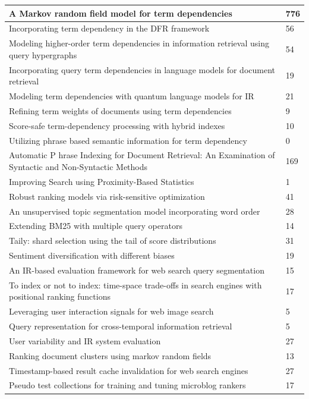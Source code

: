 \documentclass[letterpaper,11pt]{article}
\begin{document}
\begin{center}
\begin{longtable}{|*2{p{3.5cm}| }}
A Markov random field model for term dependencies & 776 \\ \hline
Incorporating term dependency in the DFR framework & 56 \\ \hline
Modeling higher-order term dependencies in information retrieval using query hypergraphs & 54 \\ \hline
Incorporating query term dependencies in language models for document retrieval & 19 \\ \hline
Modeling term dependencies with quantum language models for IR & 21 \\ \hline
Refining term weights of documents using term dependencies & 9 \\ \hline
Score-safe term-dependency processing with hybrid indexes & 10 \\ \hline
Utilizing phrase based semantic information for term dependency & 0 \\ \hline
Automatic P hrase Indexing for Document Retrieval: An Examination of Syntactic and Non-Syntactic Methods & 169 \\ \hline
Improving Search using Proximity-Based Statistics & 1 \\ \hline
Robust ranking models via risk-sensitive optimization & 41 \\ \hline
An unsupervised topic segmentation model incorporating word order & 28 \\ \hline
Extending BM25 with multiple query operators & 14 \\ \hline
Taily: shard selection using the tail of score distributions & 31 \\ \hline
Sentiment diversification with different biases & 19 \\ \hline
An IR-based evaluation framework for web search query segmentation & 15 \\ \hline
To index or not to index: time-space trade-offs in search engines with positional ranking functions & 17 \\ \hline
Leveraging user interaction signals for web image search & 5 \\ \hline
Query representation for cross-temporal information retrieval & 5 \\ \hline
User variability and IR system evaluation & 27 \\ \hline
Ranking document clusters using markov random fields & 13 \\ \hline
Timestamp-based result cache invalidation for web search engines & 27 \\ \hline
Pseudo test collections for training and tuning microblog rankers & 17 \\ \hline

\end{longtable}
\end{center}
\end{document}
